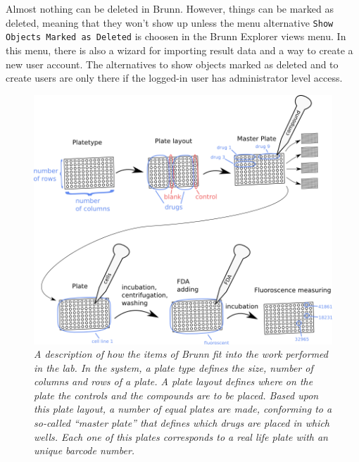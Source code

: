 \documentclass[a4paper,10pt]{article}
\begin{document}
            Almost nothing can be deleted in Brunn. However, things can be
            marked as deleted, meaning that they won't show up unless the menu
            alternative \texttt{Show Objects Marked as Deleted} is choosen in
            the Brunn Explorer views menu. In this menu, there is also a wizard
            for importing result data and a way to create a new user account.
            The alternatives to show objects marked as deleted and to create
            users are only there if the logged-in user has administrator
            level access.
        
        \begin{figure}[htbp]
            \begin{center}
                \includegraphics[width=1\textwidth]{images/labWork.png}
            \end{center}
            \caption{\textit{A description of how the items of Brunn fit into
                             the work performed in the lab. In the system, a
                             plate type defines the size, number of columns and
                             rows of a plate. A plate layout defines where on
                             the plate the controls and the compounds are to be
                             placed. Based upon this plate layout, a number of
                             equal plates are made, conforming to a so-called
                             “master plate” that defines which drugs are placed
                             in which wells. Each one of this plates corresponds
                             to a real life plate with an unique barcode
                             number. }}
            \label{labWork}
        \end{figure}
\end{document}
